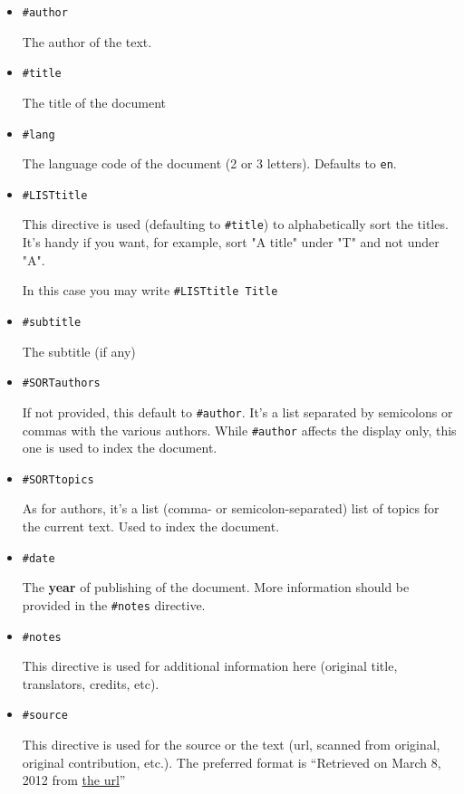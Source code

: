 \documentclass[DIV=12,%
               BCOR=0mm,%
               fontsize=10pt,%
               oneside,%
               paper=210mm:11in]{scrbook}
\begin{document}
\begin{itemize}
\item\relax 
\texttt{\#author}


The author of the text.



\item\relax 
\texttt{\#title}


The title of the document



\item\relax 
\texttt{\#lang}


The language code of the document (2 or 3 letters). Defaults to \texttt{en}.



\item\relax 
\texttt{\#LISTtitle}


This directive is used (defaulting to \texttt{\#title}) to alphabetically
sort the titles. It's handy if you want, for example, sort "A
title" under "T" and not under "A".


In this case you may write \texttt{\#LISTtitle Title}



\item\relax 
\texttt{\#subtitle}


The subtitle (if any)



\item\relax 
\texttt{\#SORTauthors}


If not provided, this default to \texttt{\#author}. It's a list
separated by semicolons or commas with the various authors. While
\texttt{\#author} affects the display only, this one is used to index the
document.



\item\relax 
\texttt{\#SORTtopics}


As for authors, it's a list (comma- or
semicolon-separated) list of topics for the current text. Used to
index the document.



\item\relax 
\texttt{\#date}


The \textbf{year} of publishing of the document. More information
should be provided in the \texttt{\#notes} directive.



\item\relax 
\texttt{\#notes}


This directive is used for additional information here (original
title, translators, credits, etc).



\item\relax 
\texttt{\#source}


This directive is used for the source or the text (url, scanned from
original, original contribution, etc.). The preferred format is
“Retrieved on March 8, 2012 from \href{http://url.org}{the url}”




\end{itemize}
\end{document}
